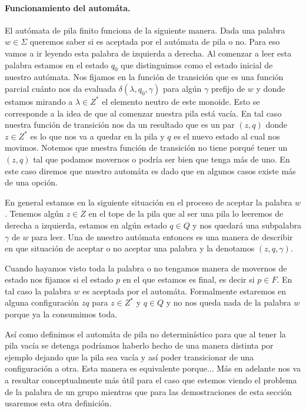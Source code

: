 \documentclass[tesis.tex]{subfiles}
\newcommand{\APND}{automáta de pila no determinístico }
\begin{document}
\paragraph{Funcionamiento del automáta.}

El autómata de pila finito funciona de la siguiente manera. 
Dada una palabra $w \in \Sigma$ queremos saber si es aceptada por el autómata de pila o no. Para eso vamos a ir leyendo esta palabra de izquierda a derecha. 
Al comenzar a leer esta palabra estamos en el estado $q_0$ que distinguimos como el estado inicial de nuestro autómata. 
Nos fijamos en la función de transición que es una función parcial cuánto nos da evaluada  $\delta(\lambda,q_0,\gamma)$ para algún $\gamma$ prefijo de $w$ y donde estamos mirando a $\lambda \in Z^*$ el elemento neutro de este monoide. 
Esto se corresponde a la idea de que al comenzar nuestra pila está vacía. 
En tal caso nuestra función de transición nos da un resultado que es un par $(z,q)$ donde $z \in Z^{*}$ es lo que nos va a quedar en la pila y $q$ es el nuevo estado al cual nos movimos. 
Notemos que nuestra función de transición no tiene porqué tener un $(z,q)$ tal que podamos movernos o podría ser bien que tenga más de uno. 
En este caso diremos que nuestro automáta es  dado que en algunos casos existe más de una opción.

En general estamos en la siguiente situación en el proceso de aceptar la palabra $w$. 
Tenemos algún $z \in Z$ en el tope de la pila que al ser una pila lo leeremos de derecha a izquierda, estamos en algún estado $q \in Q$ y nos quedará una subpalabra $\gamma$ de $w$ para leer. Una  de nuestro autómata entonces es una manera de describir en que situación de aceptar o no aceptar una palabra y la denotamos $(z,q,\gamma)$. 

Cuando hayamos visto toda la palabra o no tengamos manera de movernos de estado nos fijamos si el estado $p$ en el que estamos es final, es decir si $p \in F$. 
En tal caso la palabra $w$ es aceptada por el automáta. Formalmente estaremos en alguna configuración $zq$ para $z \in Z^*$ y $q \in Q$ y no nos queda nada de la palabra $w$ porque ya la consumimos toda.
\medskip
\begin{obs}
	Así como definimos el \APND para que al tener la pila vacía se detenga podríamos haberlo hecho de una manera distinta por ejemplo dejando que la pila sea vacía y así poder transicionar de una configuración a otra.	
	Esta manera es equivalente porque...
	Más en adelante nos va a resultar conceptualmente más útil para el caso que estemos viendo el problema de la palabra de un grupo mientras que para las demostraciones de esta sección usaremos esta otra definición.
\end{obs}
\end{document}

